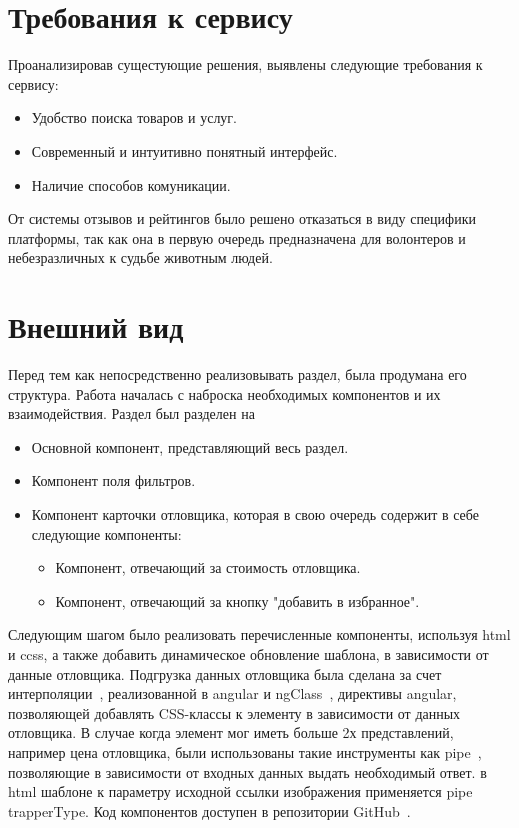 
\section{Требования к сервису}
 Проанализировав сущестующие решения, выявлены следующие требования к сервису:
 \begin{itemize}
      \item Удобство поиска товаров и услуг.
      \item Современный и интуитивно понятный интерфейс.
      \item Наличие способов комуникации.
\end{itemize}

От системы отзывов и рейтингов было решено отказаться в виду специфики платформы, так как она
в первую очередь предназначена для волонтеров и небезразличных к судьбе животным людей.

\section{Внешний вид}
Перед тем как непосредственно реализовывать раздел, была продумана его структура. Работа началась с наброска необходимых компонентов и их взаимодействия.
Раздел был разделен на
\begin{itemize}
      \item Основной компонент, представляющий весь раздел.
      \item Компонент поля фильтров.
      \item Компонент карточки отловщика, которая в свою очередь содержит в себе следующие компоненты:
      \begin{itemize}
            \item Компонент, отвечающий за стоимость отловщика.
            \item Компонент, отвечающий за кнопку "добавить в избранное".
      \end{itemize}
\end{itemize}

Следующим шагом было реализовать перечисленные компоненты, используя html и ccss, а также добавить динамическое обновление шаблона, в зависимости от данные отловщика.
Подгрузка данных отловщика была сделана за счет интерполяции~\cite{interpolation}, реализованной в angular и ngClass~\cite{ngClass}, директивы angular,
позволяющей добавлять CSS-классы к элементу в зависимости от данных отловщика. В случае когда элемент мог иметь больше 2х представлений, например цена отловщика, были
использованы такие инструменты как pipe~\cite{pipes}, позволяющие в зависимости от входных данных выдать необходимый ответ.
в html шаблоне к параметру исходной ссылки изображения применяется pipe trapperType.
Код компонентов доступен в репозитории GitHub~\cite{github}.

